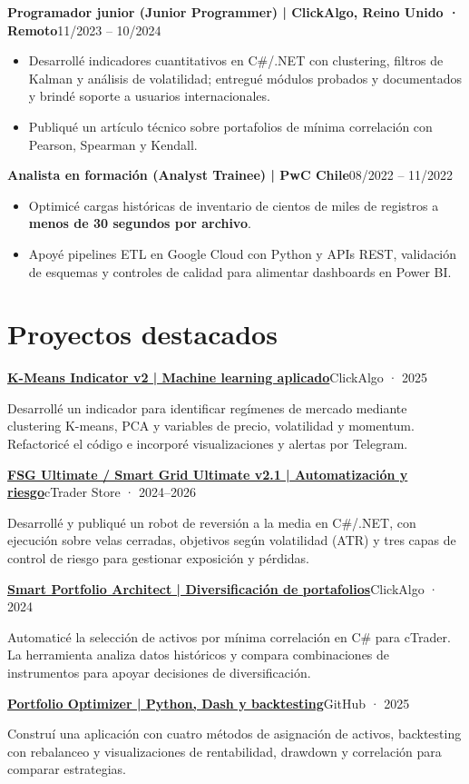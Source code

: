 \documentclass[10pt,a4paper]{article}
\newcommand{\entry}[2]{\par\addvspace{3pt}\textbf{#1}\hfill{\fontsize{9.5}{11}\selectfont\color{muted}#2}\par\nopagebreak}
\newcommand{\project}[3]{\par\addvspace{3pt}\textbf{\href{#1}{#2}}\hfill{\fontsize{9.5}{11}\selectfont\color{muted}#3}\par\nopagebreak}
\begin{document}
\entry{Programador junior (Junior Programmer) | ClickAlgo, Reino Unido · Remoto}{11/2023 -- 10/2024}
\begin{itemize}
  \item Desarrollé indicadores cuantitativos en C\#/.NET con clustering, filtros de Kalman y análisis de volatilidad;
  entregué módulos probados y documentados y brindé soporte a usuarios internacionales.
  \item Publiqué un artículo técnico sobre portafolios de mínima correlación con Pearson, Spearman y Kendall.
\end{itemize}

\entry{Analista en formación (Analyst Trainee) | PwC Chile}{08/2022 -- 11/2022}
\begin{itemize}
  \item Optimicé cargas históricas de inventario de cientos de miles de registros a \textbf{menos de 30 segundos por archivo}.
  \item Apoyé pipelines ETL en Google Cloud con Python y APIs REST, validación de esquemas y controles
  de calidad para alimentar dashboards en Power BI.
\end{itemize}

\section{Proyectos destacados}
\project{https://clickalgo.com/k-means}{K-Means Indicator v2 | Machine learning aplicado}{ClickAlgo · 2025}
Desarrollé un indicador para identificar regímenes de mercado mediante clustering K-means, PCA y variables
de precio, volatilidad y momentum. Refactoricé el código e incorporé visualizaciones y alertas por Telegram.

\project{https://ctrader.com/products/438}{FSG Ultimate / Smart Grid Ultimate v2.1 | Automatización y riesgo}{cTrader Store · 2024--2026}
Desarrollé y publiqué un robot de reversión a la media en C\#/.NET, con ejecución sobre velas cerradas,
objetivos según volatilidad (ATR) y tres capas de control de riesgo para gestionar exposición y pérdidas.

\project{https://clickalgo.com/smart-portfolio-architect}{Smart Portfolio Architect | Diversificación de portafolios}{ClickAlgo · 2024}
Automaticé la selección de activos por mínima correlación en C\# para cTrader. La herramienta analiza datos
históricos y compara combinaciones de instrumentos para apoyar decisiones de diversificación.

\project{https://github.com/walterm2482/portfolio-optimizer}{Portfolio Optimizer | Python, Dash y backtesting}{GitHub · 2025}
Construí una aplicación con cuatro métodos de asignación de activos, backtesting con rebalanceo y
visualizaciones de rentabilidad, drawdown y correlación para comparar estrategias.
\end{document}

